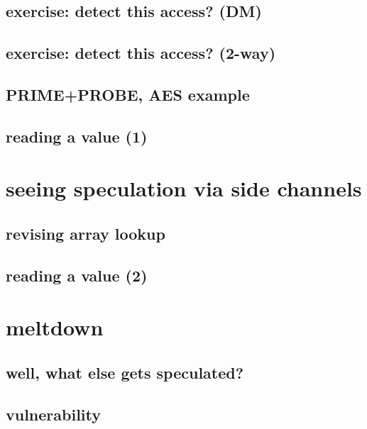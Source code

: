 \subsection{exercise: detect this access? (DM)}

\subsection{exercise: detect this access? (2-way)}


\subsection{PRIME+PROBE, AES example}

\subsection{reading a value (1)}


\section{seeing speculation via side channels}

\subsection{revising array lookup}



\subsection{reading a value (2)}


\section{meltdown}

\subsection{well, what else gets speculated?}


\subsection{vulnerability}


